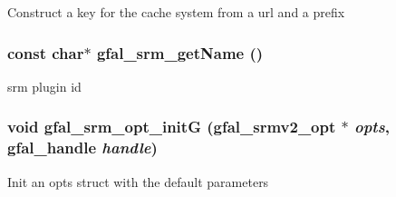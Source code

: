 Construct a key for the cache system from a url and a prefix 
\subsubsection{\setlength{\rightskip}{0pt plus 5cm}const char$\ast$ gfal\_\-srm\_\-get\-Name ()}\label{gfal__common__srm_8h_9eaea5b630099808082807628bd08e5f}


srm plugin id 
\subsubsection{\setlength{\rightskip}{0pt plus 5cm}void gfal\_\-srm\_\-opt\_\-init\-G (gfal\_\-srmv2\_\-opt $\ast$ {\em opts}, gfal\_\-handle {\em handle})}\label{gfal__common__srm_8h_00d7f2a5c374d306365e5dd0baf73c94}


Init an opts struct with the default parameters 
